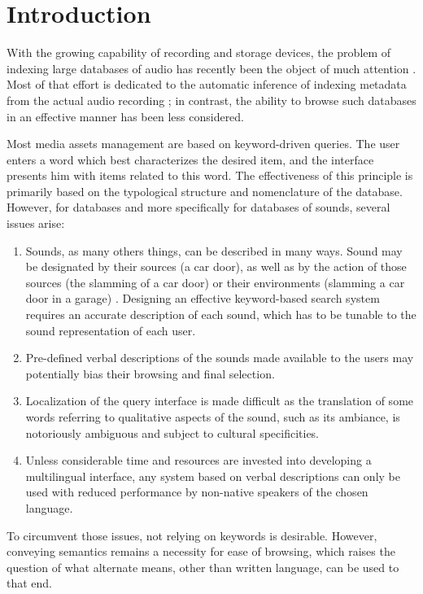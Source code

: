 \documentclass{aes2e}
\begin{document}

\section{Introduction}

With the growing capability of recording and storage devices, the problem of indexing large databases of audio has recently been the object of much attention \cite{Wold1996}. Most of that effort is dedicated to the automatic inference of indexing metadata from the actual audio recording \cite{Zhang1999, tzanetakis2002musical}; in contrast, the ability to browse such databases in an effective manner has been less considered.

Most media assets management are based on keyword-driven queries. The user enters a word which best characterizes the desired item, and the interface presents him with items related to this word. The effectiveness of this principle is primarily based on the typological structure and nomenclature of the database. However, for databases and more specifically for databases of sounds, several issues arise:

\begin{enumerate}
\item Sounds, as many others things, can be described in many ways. Sound may be designated by their
sources (a car door), as well as by the action of those sources (the slamming of a car door) or their environments (slamming a car door in a garage) \cite{houix2012lexical, niessen2010categories, brown2011towards}. Designing an effective keyword-based search system requires an accurate description of each sound, which has to be tunable to the sound representation of each user.
\item Pre-defined verbal descriptions of the sounds made available to the users may potentially bias their browsing and final selection.
\item Localization of the query interface is made difficult as the translation of some words referring to qualitative aspects of the sound, such as its ambiance, is notoriously ambiguous and subject to cultural specificities.
\item Unless considerable time and resources are invested into developing a multilingual interface, any system based on verbal descriptions can only be used with reduced performance by non-native speakers of the chosen language.
\end{enumerate}
To circumvent those issues, not relying on keywords is desirable. However, conveying semantics remains a necessity for ease of browsing, which raises the question of what alternate means, other than written language, can be used to that end.
\end{document}

